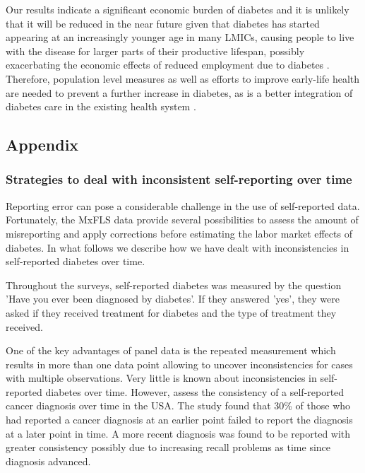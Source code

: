 \documentclass[12pt,english]{article}
\begin{document}
Our results indicate a significant economic burden of diabetes and it is unlikely that it will be reduced in the near future given that diabetes has started appearing at an increasingly younger age in many \ac{LMICs}, causing people to live with the disease for larger parts of their productive lifespan, possibly exacerbating the economic effects of reduced employment due to diabetes \parencite{Hu2011,Villalpando2010}. Therefore, population level measures as well as efforts to improve early-life health are needed to prevent a further increase in diabetes, as is a better integration of diabetes care in the existing health system \parencite{Gutierrez-delgado2009}.


\clearpage
\begin{appendix}



\part*{\label{part:Appendix}Appendix}

\section{\label{sec:Appendix}Strategies to deal with inconsistent self-reporting over time}

Reporting error can pose a considerable challenge in the use of self-reported data. Fortunately, the \ac{MxFLS} data provide several possibilities to assess the amount of misreporting and apply corrections before estimating the labor market effects of diabetes. In what follows we describe how we have dealt with inconsistencies in self-reported diabetes over time.

Throughout the surveys, self-reported diabetes was measured by the question 'Have you ever been diagnosed by diabetes'. If they answered 'yes', they were asked if they received treatment for diabetes and the type of treatment they received.

One of the key advantages of panel data is the repeated measurement which results in more than one data point allowing to uncover inconsistencies for cases with multiple observations. Very little is known about inconsistencies in self-reported diabetes over time. However, \textcite{Zajacova2010} assess the consistency of a self-reported cancer diagnosis over time in the USA. The study found that 30\% of those who had reported a cancer diagnosis at an earlier point failed to report the diagnosis at a later point in time. A more recent diagnosis was found to be reported with greater consistency possibly due to increasing recall problems as time since diagnosis advanced.


\end{appendix}
\end{document}
